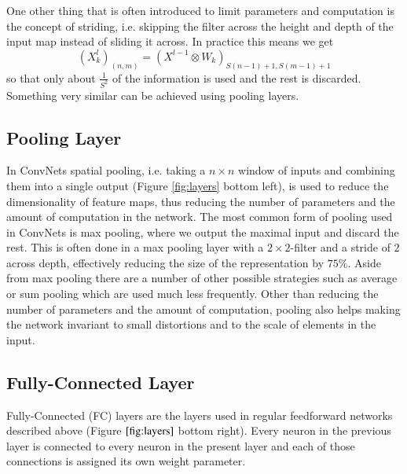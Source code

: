 \documentclass[preprint,12pt,3p]{elsarticle}
\begin{document}
One other thing that is often introduced to limit parameters and computation is the concept of striding, i.e. skipping the filter across the height and depth of the input map instead of sliding it across. In practice this means we get
$$(X^{l}_k)_{(n,m)}=(X^{l-1}\otimes W_k)_{S(n-1)+1,S(m-1)+1}$$
so that only about $\frac{1}{S^2}$ of the information is used and the rest is discarded. Something very similar can be achieved using pooling layers.



\subsection{Pooling Layer}
In ConvNets spatial pooling, i.e. taking a $n\times n$ window of inputs and combining them into a single output (Figure \ref{fig:layers} bottom left), is used to reduce the dimensionality of feature maps, thus reducing the number of parameters and the amount of computation in the network. The most common form of pooling used in ConvNets is max pooling, where we output the maximal input and discard the rest. This is often done in a max pooling layer with a $2\times2$-filter and a stride of $2$ across depth, effectively reducing the size of the representation by $75\%$. Aside from max pooling there are a number of other possible strategies such as average or sum pooling which are used much less frequently. Other than reducing the number of parameters and the amount of computation, pooling also helps making the network invariant to small distortions and to the scale of elements in the input.

\subsection{Fully-Connected Layer}
Fully-Connected (FC) layers are the layers used in regular feedforward networks described above (Figure $\ref{fig:layers}$ bottom right). Every neuron in the previous layer is connected to every neuron in the present layer and each of those connections is assigned its own weight parameter. 
\end{document}
